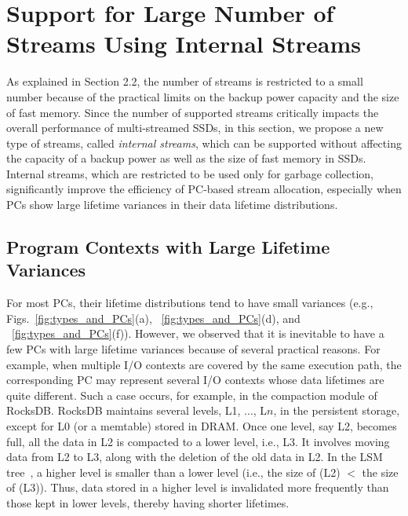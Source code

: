 \section{Support for Large Number of Streams Using Internal Streams}
\label{sec:internal}
As explained in Section 2.2, the number of streams is restricted to a small number 
because of the practical limits on the backup power capacity and the size of fast memory.  
Since the number of supported streams critically impacts the overall performance 
of multi-streamed SSDs, in this section, we propose a new type of streams, 
called {\it internal streams}, which can be
supported without affecting the capacity of a backup power as well as 
the size of fast memory in SSDs.   
Internal streams, which are restricted to be used only for garbage collection, 
significantly improve the efficiency of PC-based stream allocation,
especially when PCs show large lifetime variances in their data lifetime
distributions.

\subsection{Program Contexts with Large Lifetime Variances}
For most PCs, their lifetime distributions tend to have small variances
(e.g., Figs.~\ref{fig:types_and_PCs}(a), ~\ref{fig:types_and_PCs}(d), and
~\ref{fig:types_and_PCs}(f)).
However, we observed that 
it is inevitable to have a few PCs with large lifetime variances 
because of several practical reasons.
For example, when multiple I/O contexts are covered by the same execution path, 
the corresponding PC may represent several I/O contexts whose data lifetimes are quite different.   
Such a case occurs, for example, 
in the compaction module of RocksDB.
RocksDB maintains
several levels, L1, ..., L$n$, in the persistent storage, except for L0 (or a
memtable) stored in DRAM.  Once one level, say L2, becomes full, all the data
in L2 is compacted to a lower level, i.e., L3.  It involves moving data from L2
to L3, along with the deletion of the old data in L2.  In the
LSM tree~\cite{LSM}, a higher level is smaller than a lower level 
(i.e., the size of (L2) $<$ the size of (L3)). 
Thus, data stored in a higher level is invalidated more frequently than those kept
in lower levels, thereby having shorter lifetimes.


